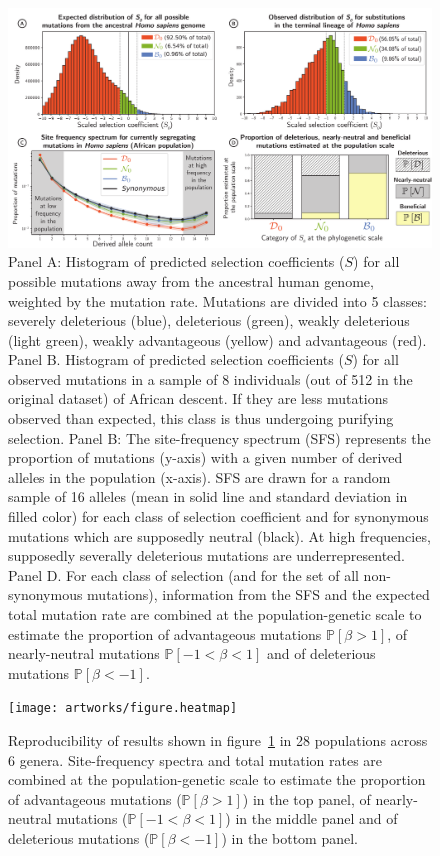\documentclass{article}
\newcommand{\proba}{\mathbb{P}}
\newcommand{\Sphy}{S}
\newcommand{\Spop}{\beta}
\newcommand{\polyDel}{\Spop < -1}
\newcommand{\polyNeutral}{-1 < \Spop < 1}
\newcommand{\polyAdv}{ \Spop > 1}
\newcommand{\PpolyDel}{\proba \left[ \polyDel \right]}
\newcommand{\PpolyNeutral}{\proba \left[ \polyNeutral \right]}
\newcommand{\PpolyAdv}{\proba \left[ \polyAdv \right]}
\begin{document}
    \begin{figure}[!ht]
        \centering
        \includegraphics[width=\textwidth, page=1] {artworks/figure.homo-afr-results}
        \caption{
            Panel A: Histogram of predicted selection coefficients ($\Sphy$) for all possible mutations away from the ancestral human genome, weighted by the mutation rate.
            Mutations are divided into 5 classes: severely deleterious (blue), deleterious (green), weakly deleterious (light green), weakly advantageous (yellow) and advantageous (red).
            Panel B. Histogram of predicted selection coefficients ($\Sphy$) for all observed mutations in a sample of 8 individuals (out of 512 in the original dataset) of African descent.
            If they are less mutations observed than expected, this class is thus undergoing purifying selection.
            Panel B: The site-frequency spectrum (SFS) represents the proportion of mutations (y-axis) with a given number of derived alleles in the population (x-axis).
            SFS are drawn for a random sample of 16 alleles (mean in solid line and standard deviation in filled color) for each class of selection coefficient and for synonymous mutations which are supposedly neutral (black).
            At high frequencies, supposedly severally deleterious mutations are underrepresented.
            Panel D. For each class of selection (and for the set of all non-synonymous mutations), information from the SFS and the expected total mutation rate are combined at the population-genetic scale to estimate the proportion of advantageous mutations $\PpolyAdv$, of nearly-neutral mutations $\PpolyNeutral$ and of deleterious mutations $\PpolyDel$.
        }
        \label{fig:homo-afr-results}
    \end{figure}

    \begin{figure}[!ht]
        \centering
        \texttt{[image: artworks/figure.heatmap]}
        \caption{
            Reproducibility of results shown in figure~\ref{fig:homo-afr-results} in 28 populations across 6 genera.
            Site-frequency spectra and total mutation rates are combined at the population-genetic scale to estimate the proportion of advantageous mutations ($\PpolyAdv$) in the top panel, of nearly-neutral mutations ($\PpolyNeutral$) in the middle panel and of deleterious mutations ($\PpolyDel$) in the bottom panel.
        }
        \label{fig:heatmap}
    \end{figure}
\end{document}
